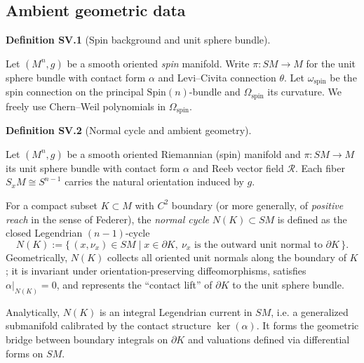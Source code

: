 \documentclass[10pt, letterpaper]{article}
\newcommand{\Spin}{\mathrm{Spin}}
\newcommand{\CustomHeading}[3]{%
  \par\medskip\noindent%
  \textbf{#1 #2} \textnormal{(#3)}.\enskip%
}
\newenvironment{DEF}[2]{\begin{unitbox}\CustomHeading{Definition}{#1}{#2}}{\end{unitbox}}
\begin{document}
\subsection{Ambient geometric data}



\begin{DEF}{SV.1}{Spin background and unit sphere bundle}
Let $(M^n,g)$ be a smooth oriented \emph{spin} manifold.
Write $\pi: SM \to M$ for the unit sphere bundle with contact form $\alpha$ and Levi--Civita connection $\theta$.
Let $\omega_{\mathrm{spin}}$ be the spin connection on the principal $\Spin(n)$-bundle and
$\Omega_{\mathrm{spin}}$ its curvature. We freely use Chern--Weil polynomials in $\Omega_{\mathrm{spin}}$.
\end{DEF}

\begin{DEF}{SV.2}{Normal cycle and ambient geometry}
Let $(M^n,g)$ be a smooth oriented Riemannian (spin) manifold and $\pi:SM\to M$ its unit sphere bundle with contact form $\alpha$ and Reeb vector field $\mathcal R$.
Each fiber $S_xM\cong S^{n-1}$ carries the natural orientation induced by $g$.

For a compact subset $K\subset M$ with $C^2$ boundary (or more generally, of \emph{positive reach} in the sense of Federer),
the \emph{normal cycle} $N(K)\subset SM$ is defined as the closed Legendrian $(n-1)$-cycle
\[
N(K):=\{\, (x,\nu_x)\in SM\;|\; x\in\partial K,\ \nu_x\text{ is the outward unit normal to }\partial K\,\}.
\]
Geometrically, $N(K)$ collects all oriented unit normals along the boundary of $K$; it is invariant under orientation-preserving diffeomorphisms, satisfies $\alpha|_{N(K)}=0$, and represents the ``contact lift'' of $\partial K$ to the unit sphere bundle.

Analytically, $N(K)$ is an integral Legendrian current in $SM$, i.e. a generalized submanifold calibrated by the contact structure $\ker(\alpha)$. It forms the geometric bridge between boundary integrals on $\partial K$ and valuations defined via differential forms on $SM$.
\end{DEF}
\end{document}
